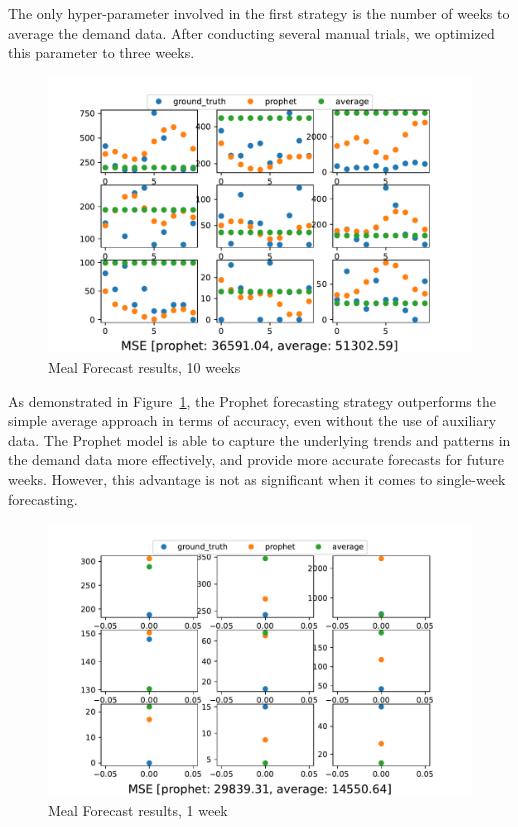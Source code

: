The only hyper-parameter involved in the first strategy is the number of weeks to average the demand data. After conducting several manual trials, we optimized this parameter to three weeks.


\begin{figure}[tb]
    \centering
    \includegraphics[width=1\columnwidth]{figures/meal_forecast_res_long.pdf}
    \caption{Meal Forecast results, 10 weeks}
  \label{fig:meal-forecast-res-long}
\end{figure}

As demonstrated in Figure~\ref{fig:meal-forecast-res-long}, the Prophet forecasting strategy outperforms the simple average approach in terms of accuracy, even without the use of auxiliary data. The Prophet model is able to capture the underlying trends and patterns in the demand data more effectively, and provide more accurate forecasts for future weeks. However, this advantage is not as significant when it comes to single-week forecasting.

\begin{figure}[tb]
    \centering
    \includegraphics[width=1\columnwidth]{figures/meal_forecast_res_short.pdf}
    \caption{Meal Forecast results, 1 week}
  \label{fig:meal-forecast-res-short}
\end{figure}

